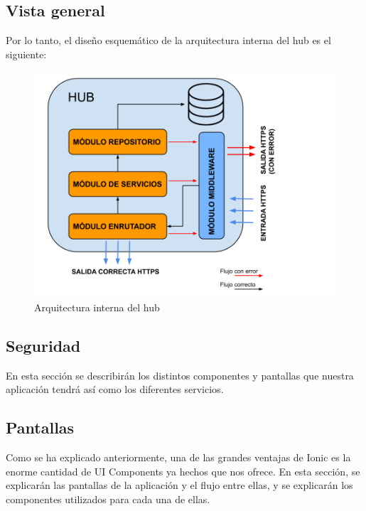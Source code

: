 \subsection{Vista general}
Por lo tanto, el diseño esquemático de la arquitectura interna del hub es el siguiente:
\begin{figure}[H]
\centering
\includegraphics[width=6.00in]{images/arquitectura_hub.png}
\caption{Arquitectura interna del hub}
\label{fig:arquitectura_hub}
\end{figure}
\subsection{Seguridad}
En esta sección se describirán los distintos componentes y pantallas que nuestra aplicación tendrá así como los diferentes servicios. 
\subsection{Pantallas}
Como se ha explicado anteriormente, una de las grandes ventajas de Ionic es la enorme cantidad de UI Components ya hechos que nos ofrece.
En esta sección, se explicarán las pantallas de la aplicación y el flujo entre ellas, y se explicarán los componentes utilizados para cada
una de ellas.
